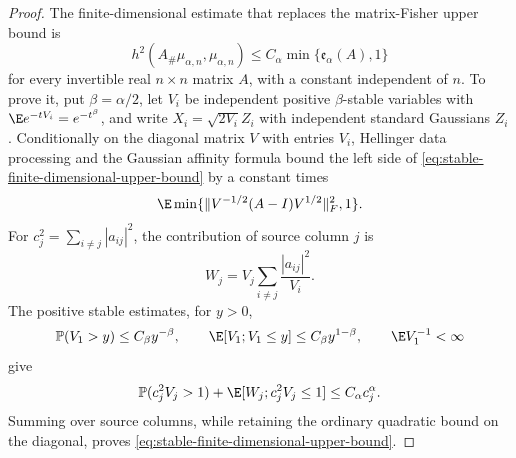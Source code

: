 \begin{proof}
The finite-dimensional estimate that replaces the matrix-Fisher upper bound is
\begin{equation}
 h^2(A_\#\mu_{\alpha,n},\mu_{\alpha,n})
 \le C_\alpha\min\{\mathfrak e_\alpha(A),1\}
 \label{eq:stable-finite-dimensional-upper-bound}
\end{equation}
for every invertible real \(n\times n\) matrix \(A\), with a constant
independent of \(n\).
To prove it, put \(\beta=\alpha/2\), let \(V_i\) be independent positive
\(\beta\)-stable variables with
\(\E e^{-tV_i}=e^{-t^\beta}\), and write
\(X_i=\sqrt{2V_i}Z_i\) with independent standard Gaussians \(Z_i\).
Conditionally on the diagonal matrix \(V\) with entries \(V_i\), Hellinger
data processing and the
Gaussian affinity formula bound the left side of
\eqref{eq:stable-finite-dimensional-upper-bound} by a constant times
\[
 \E\min\{\|V^{-1/2}(A-I)V^{1/2}\|_F^2,1\}.
\]
For \(c_j^2=\sum_{i\ne j}|a_{ij}|^2\), the contribution of source column
\(j\) is
\[
 W_j=V_j\sum_{i\ne j}\frac{|a_{ij}|^2}{V_i}.
\]
The positive stable estimates, for \(y>0\),
\[
 \mathbb P(V_1>y)\le C_\beta y^{-\beta},
 \qquad
 \E[V_1;V_1\le y]\le C_\beta y^{1-\beta},
 \qquad
 \E V_1^{-1}<\infty
\]
give
\[
 \mathbb P(c_j^2V_j>1)
 +\E[W_j;c_j^2V_j\le1]
 \le C_\alpha c_j^\alpha.
\]
Summing over source columns, while retaining the ordinary quadratic bound
on the diagonal, proves \eqref{eq:stable-finite-dimensional-upper-bound}.


\end{proof}
